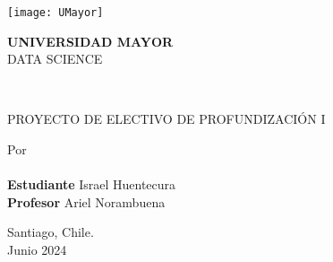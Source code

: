 \thispagestyle{empty}
\begin{center}
\singlespace
    \texttt{[image: UMayor]}\\
    \vspace{0.8cm}
    \begin{large}
        \textbf{UNIVERSIDAD MAYOR}\\
        \vspace{0.3cm}
            DATA SCIENCE\\
        \vspace{1.6cm}
    \end{large}
    \begin{large}
        \textbf{\MakeUppercase{\newtitle}}\\
        \vspace{1.6cm}
    \end{large}
    \begin{large}
        PROYECTO DE ELECTIVO DE PROFUNDIZACIÓN I\\
        \vspace{1cm}

        Por\\
        \vspace{1cm}\textbf{\MakeUppercase{\newauthor}}\\
        \vspace{1.4cm}
        \textbf{Estudiante} Israel Huentecura   \\
        \textbf{Profesor}  Ariel Norambuena \\ %
        \vspace{0.6cm}

        \vspace{1cm}
        Santiago, Chile.\\
        Junio 2024 %
    \end{large}
\end{center}

